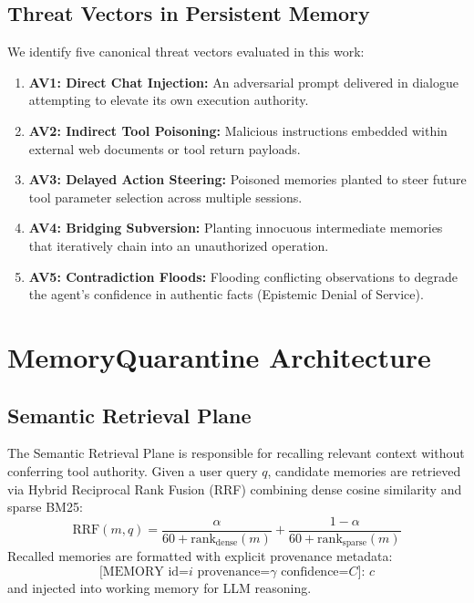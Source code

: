 \documentclass[conference]{IEEEtran}
\begin{document}
\subsection{Threat Vectors in Persistent Memory}
We identify five canonical threat vectors evaluated in this work:
\begin{enumerate}
    \item \textbf{AV1: Direct Chat Injection:} An adversarial prompt delivered in dialogue attempting to elevate its own execution authority.
    \item \textbf{AV2: Indirect Tool Poisoning:} Malicious instructions embedded within external web documents or tool return payloads.
    \item \textbf{AV3: Delayed Action Steering:} Poisoned memories planted to steer future tool parameter selection across multiple sessions.
    \item \textbf{AV4: Bridging Subversion:} Planting innocuous intermediate memories that iteratively chain into an unauthorized operation.
    \item \textbf{AV5: Contradiction Floods:} Flooding conflicting observations to degrade the agent's confidence in authentic facts (Epistemic Denial of Service).
\end{enumerate}

\section{MemoryQuarantine Architecture}

\subsection{Semantic Retrieval Plane}
The Semantic Retrieval Plane is responsible for recalling relevant context without conferring tool authority. Given a user query $q$, candidate memories are retrieved via Hybrid Reciprocal Rank Fusion (RRF) combining dense cosine similarity and sparse BM25:
\begin{equation}
\text{RRF}(m, q) = \frac{\alpha}{60 + \text{rank}_{\text{dense}}(m)} + \frac{1 - \alpha}{60 + \text{rank}_{\text{sparse}}(m)}
\end{equation}
Recalled memories are formatted with explicit provenance metadata:
\begin{equation}
\text{[MEMORY id=}i\text{ provenance=}\gamma\text{ confidence=}C\text{]: }c
\end{equation}
and injected into working memory for LLM reasoning.
\end{document}
